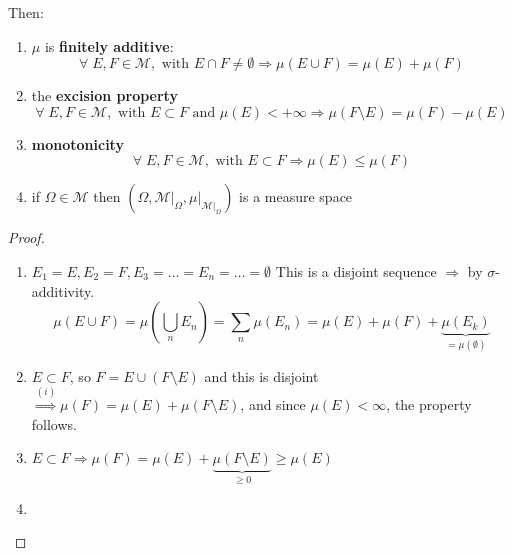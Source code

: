 Then:
\begin{enumerate}
    \item \(\mu\) is \textbf{finitely additive}: 
    \[
        \forall \; E,F \in \mathcal{M}, \mbox{ with } E \cap F \not = \emptyset \Rightarrow
    \mu(E \cup F) = \mu(E) + \mu(F)
    \]
    \item the \textbf{excision property}
    \[
        \forall \; E, F \in \mathcal{M}, \mbox{ with } E \subset F \mbox{ and } \mu(E) < +\infty \Rightarrow \mu(F\setminus E) = \mu(F) - \mu(E)
    \]
    \item \textbf{monotonicity}
    \[
        \forall \; E, F \in \mathcal{M}, \mbox{ with } E \subset F \Rightarrow \mu(E) \leq \mu(F)
    \]
    \item if \(\Omega \in \mathcal{M}\) then \((\Omega, \mathcal{M}\vert_{\Omega}, \mu\vert_{\mathcal{M}\vert_{\Omega}})\) is a measure space
\end{enumerate}
\begin{proof}
     \begin{enumerate}
        \item \(E_1 = E, E_2 = F, E_3 = \ldots = E_n = \ldots = \emptyset\) 
        This is a disjoint sequence \(\Rightarrow\) by \(\sigma\)-additivity. 
        \[
            \mu(E \cup F) = \mu\left(\bigcup_{n} E_n\right) = \sum_n \mu(E_n) = \mu(E) + \mu(F) + \underbrace{\mu(E_k)}_{= \mu(\emptyset)}
        \] 
        \item \(E \subset F\), so \(F = E \cup (F \setminus E)\) and this is disjoint \(\overset{(i)}{\Rightarrow} \mu(F) = \mu(E) + \mu(F\setminus E)\), and since \(\mu(E) < \infty\), the property follows.
        \item \(E \subset F \Rightarrow \mu(F) = \mu(E) + \underbrace{\mu(F\setminus E)}_{\geq 0} \geq \mu(E)\)
        \item 
     \end{enumerate}
    \end{proof}
